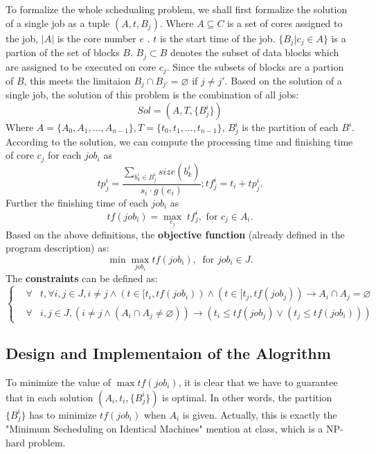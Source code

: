 \documentclass{llncs}
\begin{document}
  To formalize the whole schedualing problem, we shall first formalize the solution of a single job as a tuple $(A,t,B_j)$.
  Where $A \subseteq C$ is a set of cores assigned to the job, $|A|$ is the core number $e$ . $t$ is the start time of the job. $\{B_j | c_j \in A\}$ is a partion of the set of blocks $B$.
 $B_j \subset B$ denotes the subset of data blocks which are assigned to be executed on core $c_j$. Since the subsets of blocks are a partion of $B$, this meets the limitaion $B_{j} \cap B_{j'} = \varnothing$ if $j \neq j'$.
 Based on the solution of a single job, the solution of this problem is the combination of all jobs:
 \begin{equation*}
 Sol = (A,T,\{B_j^i\})
 \end{equation*}
 Where $A = \{A_0,A_1,...,A_{n-1}\}, T = \{t_0,t_1,...,t_{n-1}\}$, ${B_j^i}$ is the partition of each $B^i$. According to the solution, we can compute the processing time and finishing time of core $c_j$ for each $job_i$ as
 \begin{equation*}
 tp^i_{j} = \frac{\sum_{b^i_{k} \in B^i_{j}}size(b^i_{k})}{s_i \cdot g(e_i)}; tf^i_{j} = t_i + tp^i_{j}.
 \end{equation*}
Further the finishing time of each $job_i$ as
 \begin{equation*}
 tf(job_i) = \max_{c_j} \; tf^i_{j}, \text{ for } c_j \in A_i.
 \end{equation*}
Based on the above definitions, the \textbf{objective function} (already defined in the program description) as:
  \begin{equation*}
  \min \max_{job_i} tf(job_i), \ \text{ for } job_i \in J.
  \end{equation*}
The \textbf{constraints} can be defined as:
\begin{equation} \label{constraints-job0}
\left\{
\begin{array}{ccl}
 &\forall &t, \forall i, j \in J, i \neq j \land (t \in [t_i,tf(job_i)) \land (t \in [t_j,tf(job_j))
 \rightarrow A_i \cap A_j = \varnothing \\
 &\forall &i, j \in J, (i \neq j \land (A_i \cap A_j \neq \varnothing)) \rightarrow (t_i \leq tf(job_j) \lor (t_j \leq tf(job_i)))
\end{array}
\right.
\end{equation}

\subsection{Design and Implementaion of the Alogrithm}\label{subsec-algo1}
  To minimize the value of $\max tf(job_i) $, it is clear that we have to guarantee that in each solution $(A_i,t_i,\{B_j^i\})$ is optimal. In other words, the partition  $\{B_j^i\}$ has to minimize $tf(job_i)$ when $A_i$ is given. Actually, this is exactly the  "Minimum Secheduling on Identical Machines" mention at class, which is a NP-hard problem.
\end{document}
